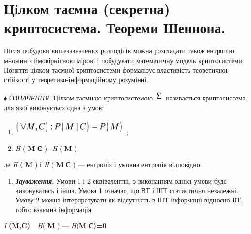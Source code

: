 \bigskip

\section{Цілком таємна (секретна)  криптосистема. Теореми  Шеннона.}


\bigskip


\bigskip

Після побудови вищезазначених розподілів можна розглядати також  ентропію множин
з ймовірнісною мірою і побудувати математичну модель криптосистеми. Поняття
цілком таємної криптосистеми формалізує властивість теоретичної стійкості у
теоретико-інформаційному розумінні.


\bigskip

$\blacklozenge$ О\textit{ЗНАЧЕННЯ}. Цілком таємною криптосистемою 
\includegraphics[width=0.1882in,height=0.2008in]{crypt-img/crypt-img22.png} 
називається криптосистема, для якої виконується одна з умов:

\liststyleWWviiiNumxliii
\begin{enumerate}
\item 
\includegraphics[width=2.3417in,height=0.3346in]{crypt-img/crypt-img23.png} ;
\item  \textit{H}\textit{ }( \textbf{M} {\textbar} \textbf{С}
)\textit{=}\textit{H}\textit{ }( \textbf{M} ), 
\end{enumerate}
де  \textit{H} \textbf{( }\textbf{M} )  і  \textit{H} (  \textbf{M}\textbf{
{\textbar} С} ) --- ентропія і  умовна ентропія відповідно.

\liststyleWWviiiNumxliii
\setcounter{saveenum}{\value{enumi}}
\begin{enumerate}
\setcounter{enumi}{\value{saveenum}}
\item \textbf{\textit{Зауваження}}\textbf{.} Умови 1 і 2 еквівалентні, з
виконанням  однієї умови буде виконуватись і інша. Умова 1 означає, що ВТ і ШТ
статистично незалежні. Умову 2 можна інтерпретувати як відсутність в ШТ
інформації відносно ВТ, тобто взаємна інформація  
\end{enumerate}
\textit{ } \textit{I}\textit{
}\textbf{(}\textbf{M}\textbf{,}\textbf{C}\textbf{)}=\textit{ H}( \textbf{M} ) ---
\textit{H}(\textbf{M} {\textbar} \textbf{С)=0}


